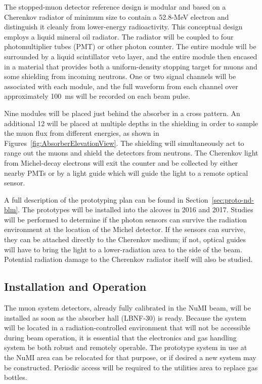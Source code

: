The stopped-muon detector reference design
is modular and based on a Cherenkov radiator of
minimum size to contain a 52.8-MeV electron and distinguish it cleanly
from lower-energy radioactivity. This conceptual design employs
a liquid mineral oil  radiator. The radiator will be coupled to four photomultiplier tubes (PMT) or
other photon counter.  The entire module will be surrounded by a 
liquid scintillator veto layer, and the entire module then
encased in a material that provides both a uniform-density stopping
target for muons and some shielding from incoming neutrons. One or two
signal channels will be associated with each module, and the full
waveform from each channel over approximately 100~ms will be recorded
on each beam pulse.

Nine modules will be placed just behind the absorber in a cross pattern.  An additional 12 will be 
placed at multiple depths in the shielding in order to sample the muon flux
from different energies, as shown in Figures~\ref{fig:AbsorberElevationView}. 
The shielding will simultaneously act to range out the muons and shield the detectors from 
neutrons. The Cherenkov light from Michel-decay electrons will exit the 
counter and be collected by either nearby PMTs or by a light guide which will
guide the light to a remote optical sensor.  

 A full description of the prototyping plan can be found in Section~\ref{sec:proto-nd-blm}.
The prototypes will be installed into the alcoves in 2016 and 2017.
Studies will be performed to determine if the photon sensors
can survive the radiation environment at the location of the Michel
detector. If the sensors can survive, they can be attached directly to
the Cherenkov medium; if not, optical guides will have to bring the
light to a lower-radiation area to the side of the beam. Potential
radiation damage to the Cherenkov radiator itself will also be
studied.

\subsection{Installation and Operation}

The muon system detectors, already fully calibrated in the NuMI beam,
will be installed as soon as the absorber hall (LBNF-30) is ready.
Because the system will be located in a radiation-controlled
environment that will not be accessible during beam operation, it is
essential that the electronics and gas handling system be both robust
and remotely operable.  The prototype system in use at the NuMI area can be relocated for that purpose,
or if desired a new system may be constructed.
Periodic access will be required to the utilities area to replace gas bottles.

